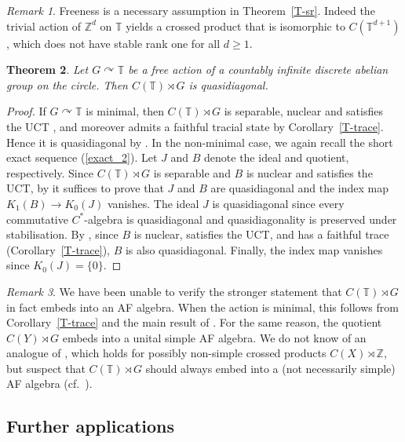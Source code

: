 \documentclass[11pt,a4paper,leqno]{amsart}
\newtheorem{thm}{Theorem}[section]
\theoremstyle{definition}
\theoremstyle{remark}
\newtheorem{rem}[thm]{Remark}
\numberwithin{equation}{section}
\theoremstyle{plain}
\newcommand{\Zb}{\mathbb{Z}}
\newcommand{\Tb}{\mathbb{T}}
\begin{document}
\begin{rem}
    Freeness is a necessary assumption in Theorem~\ref{T-sr}. Indeed the trivial action of $\Zb^d$ on $\Tb$ yields a crossed product that is isomorphic to $C(\Tb^{d+1})$, which does not have stable rank one for all $d\ge 1$. 
\end{rem}

\begin{thm}\label{T-quasidiag}
    Let $G\curvearrowright \Tb$ be a free action of a countably infinite discrete abelian group on the circle. Then $C(\Tb)\rtimes G$ is quasidiagonal.
\end{thm}

\begin{proof}
    If $G\curvearrowright \Tb$ is minimal, then $C(\Tb)\rtimes G$ is separable, nuclear and satisfies the UCT \cite{Tu99}, and moreover admits a faithful tracial state by Corollary~\ref{T-trace}. Hence it is quasidiagonal by \cite{TikWhiWin17}. In the non-minimal case, we again recall the short exact sequence (\ref{exact_2}). Let $J$ and $B$ denote the ideal and quotient, respectively. Since $C(\Tb)\rtimes G$ is separable and $B$ is nuclear and satisfies the UCT, by \cite[Theorem 3.4]{BroDad04} it suffices to prove that $J$ and $B$ are quasidiagonal and the index map $K_1(B) \to K_0(J)$ vanishes. The ideal $J$ is quasidiagonal since every commutative $C^*$-algebra is quasidiagonal and quasidiagonality is preserved under stabilisation. By \cite{TikWhiWin17}, since $B$ is nuclear, satisfies the UCT, and has a faithful trace (Corollary~\ref{T-trace}), $B$ is also quasidiagonal. Finally, the index map vanishes since $K_0(J) = \{0\}$.
\end{proof}

\begin{rem}
	We have been unable to verify the stronger statement that $C(\Tb)\rtimes G$ in fact embeds into an AF algebra. When the action is minimal, this follows from Corollary~\ref{T-trace} and the main result of \cite{Sch20}. For the same reason, the quotient $C(Y)\rtimes G$ embeds into a unital simple AF algebra. We do not know of an analogue of \cite{Pim83}, which holds for possibly non-simple crossed products $C(X)\rtimes \Zb$, but suspect that $C(\Tb)\rtimes G$ should always embed into a (not necessarily simple) AF algebra (cf.~\cite[Proposition 4.3]{PutSchSka86}).   
\end{rem}

\subsection{Further applications}\label{sec:applications}
\end{document}
